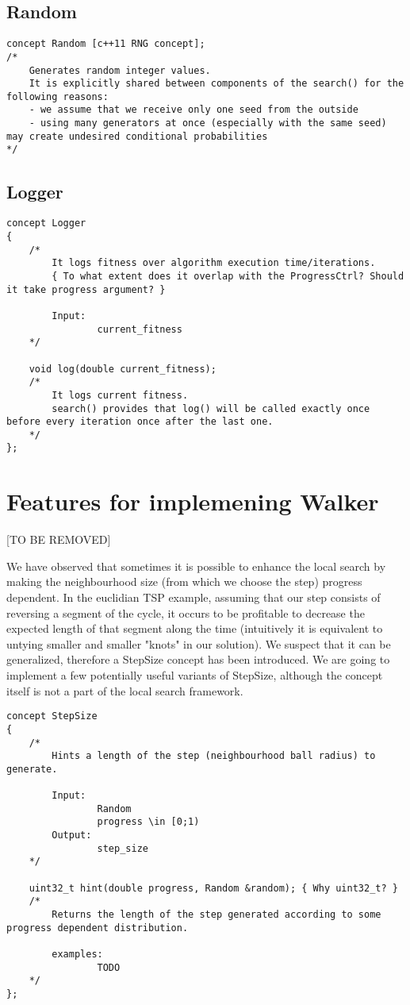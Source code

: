 \subsection{Random}

\begin{lstlisting}
concept Random [c++11 RNG concept];
/*
	Generates random integer values.
	It is explicitly shared between components of the search() for the following reasons:
	- we assume that we receive only one seed from the outside
	- using many generators at once (especially with the same seed) may create undesired conditional probabilities
*/
\end{lstlisting}

\subsection{Logger}

\begin{lstlisting}
concept Logger
{
	/*
		It logs fitness over algorithm execution time/iterations.
		{ To what extent does it overlap with the ProgressCtrl? Should it take progress argument? }

		Input:
				current_fitness
	*/

	void log(double current_fitness);
	/*
		It logs current fitness.
		search() provides that log() will be called exactly once before every iteration once after the last one.
	*/
};
\end{lstlisting}

\section{Features for implemening Walker}
[TO BE REMOVED]

We have observed that sometimes it is possible to enhance the local search
by making the neighbourhood size (from which we choose the step) progress dependent.
In the euclidian TSP example, assuming that our step consists of reversing a segment of the cycle,
it occurs to be profitable to decrease the expected length of that segment along the time
(intuitively it is equivalent to untying smaller and smaller "knots" in our solution).
We suspect that it can be generalized, therefore a StepSize concept has been introduced.
We are going to implement a few potentially useful variants of StepSize,
although the concept itself is not a part of the local search framework.

\begin{lstlisting}
concept StepSize
{
	/*
		Hints a length of the step (neighbourhood ball radius) to generate.

		Input:
				Random
				progress \in [0;1)
		Output:
				step_size
	*/

	uint32_t hint(double progress, Random &random); { Why uint32_t? }
	/*
		Returns the length of the step generated according to some progress dependent distribution.

		examples:
				TODO
	*/
};
\end{lstlisting}


